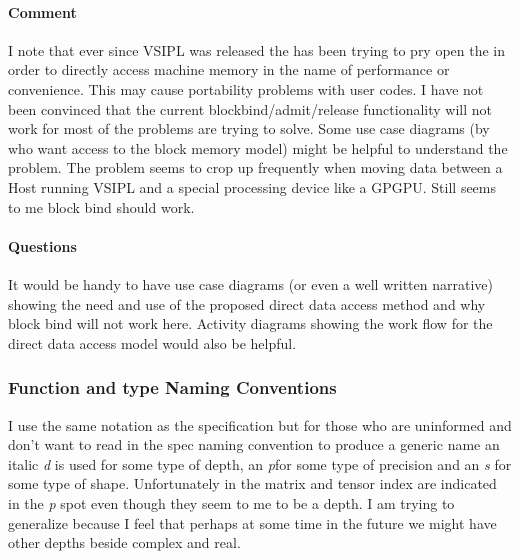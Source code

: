 \paragraph{Comment}I note that ever since VSIPL was released the  has been trying to pry open the \blk{} in order to directly access machine memory in the name of performance or convenience.  This may cause portability problems with user codes. I have not been convinced that the current blockbind/admit/release functionality will not work for most of the problems  are trying to solve.  Some use case diagrams (by  who want access to the block memory model) might be helpful to understand the problem. The problem seems to crop up frequently when moving data between a Host running VSIPL and a special processing device like a GPGPU. Still seems to me block bind should work.
\paragraph{Questions}It would be handy to have use case diagrams (or even a well written narrative) showing the need and use of the proposed direct data access method and why block bind will not work here.  Activity diagrams showing the work flow for the direct data access model would also be helpful.
\subsubsection{Function and type Naming Conventions}
I use the same notation as the \cvl{} specification but for those who are uninformed and don't want to read in the \cvl{} spec naming convention to produce a generic name an italic \emph{d} is used for some type of depth, an \emph{p}for some type of precision and an \emph{s} for some type of shape. Unfortunately in \cvl{} the matrix and tensor index are indicated in the \emph{p} spot even though they seem to me to be a depth. I am trying to generalize because I feel that perhaps at some time in the future we might have other depths beside complex and real.
